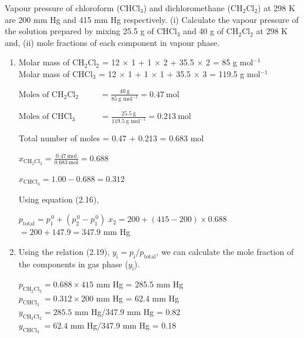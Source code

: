 \documentclass[11pt,a4paper]{article}
\begin{document}
\vspace{14pt}
\begin{tcolorbox}[enhanced,colback=white,colframe=gray!40,boxrule=0.8pt,arc=2mm,left=8pt,right=24pt,top=6pt,bottom=6pt,boxsep=0pt,drop fuzzy shadow=gray!40,overlay={\fill[SkyBlue] ([xshift=-14pt]frame.south east) rectangle (frame.north east);}]
\noindent\begin{minipage}[t]{0.78\linewidth}
Vapour pressure of chloroform (CHCl$_3$) and dichloromethane (CH$_2$Cl$_2$) at 298 K are 200 mm Hg and 415 mm Hg respectively. (i) Calculate the vapour pressure of the solution prepared by mixing 25.5 g of CHCl$_3$ and 40 g of CH$_2$Cl$_2$ at 298 K and, (ii) mole fractions of each component in vapour phase.

\vspace{6pt}
\begin{enumerate}[label=(\roman*),leftmargin=22pt,itemsep=6pt,topsep=0pt]
\item Molar mass of CH$_2$Cl$_2$ = 12 $\times$ 1 + 1 $\times$ 2 + 35.5 $\times$ 2 = 85 g mol$^{-1}$\\
Molar mass of CHCl$_3$ \;= 12 $\times$ 1 + 1 $\times$ 1 + 35.5 $\times$ 3 = 119.5 g mol$^{-1}$

\noindent$\displaystyle \text{Moles of CH}_2\text{Cl}_2 \qquad\;\; = \frac{40\ \text{g}}{85\ \text{g mol}^{-1}} = 0.47\ \text{mol}$

\noindent$\displaystyle \text{Moles of CHCl}_3 \qquad\quad = \frac{25.5\ \text{g}}{119.5\ \text{g mol}^{-1}} = 0.213\ \text{mol}$

Total number of moles = 0.47 + 0.213 = 0.683 mol

\noindent$\displaystyle x_{\text{CH}_2\text{Cl}_2} = \frac{0.47\ \text{mol}}{0.683\ \text{mol}} = 0.688$

\noindent$x_{\text{CHCl}_3} = 1.00 - 0.688 = 0.312$

Using equation (2.16),

\hspace*{1.5em}$p_{\text{total}} = p_1^{\,0} + (p_2^{\,0} - p_1^{\,0})\; x_2 = 200 + (415 - 200) \times 0.688$\\
\hspace*{3.9em}$= 200 + 147.9 = 347.9$ mm Hg
\item Using the relation (2.19), $y_\text{i} = p_\text{i}/p_{\text{total}}$, we can calculate the mole fraction of the components in gas phase ($y_\text{i}$).

\hspace*{1.5em}$p_{\text{CH}_2\text{Cl}_2} = 0.688 \times 415$ mm Hg = 285.5 mm Hg\\
\hspace*{1.5em}$p_{\text{CHCl}_3} \;= 0.312 \times 200$ mm Hg = 62.4 mm Hg\\
\hspace*{1.5em}$y_{\text{CH}_2\text{Cl}_2} = 285.5$ mm Hg/347.9 mm Hg = 0.82\\
\hspace*{1.5em}$y_{\text{CHCl}_3} \;= 62.4$ mm Hg/347.9 mm Hg = 0.18
\end{enumerate}


\end{minipage}
\end{tcolorbox}
\end{document}
